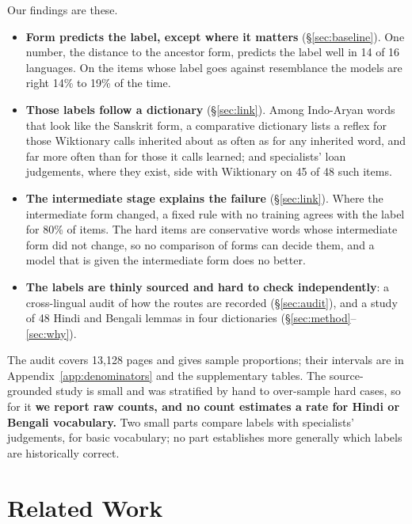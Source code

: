 \documentclass[11pt]{article}
\begin{document}
Our findings are these.
\begin{itemize}
\item \textbf{Form predicts the label, except where it matters} (\S\ref{sec:baseline}). One number, the distance to the ancestor form, predicts the label well in 14 of 16 languages. On the items whose label goes against resemblance the models are right 14\% to 19\% of the time.
\item \textbf{Those labels follow a dictionary} (\S\ref{sec:link}). Among Indo-Aryan words that look like the Sanskrit form, a comparative dictionary lists a reflex for those Wiktionary calls inherited about as often as for any inherited word, and far more often than for those it calls learned; and specialists' loan judgements, where they exist, side with Wiktionary on 45 of 48 such items.
\item \textbf{The intermediate stage explains the failure} (\S\ref{sec:link}). Where the intermediate form changed, a fixed rule with no training agrees with the label for 80\% of items. The hard items are conservative words whose intermediate form did not change, so no comparison of forms can decide them, and a model that is given the intermediate form does no better.
\item \textbf{The labels are thinly sourced and hard to check independently}: a cross-lingual audit of how the routes are recorded (\S\ref{sec:audit}), and a study of 48 Hindi and Bengali lemmas in four dictionaries (\S\ref{sec:method}--\ref{sec:why}).
\end{itemize}
The audit covers 13,128 pages and gives sample proportions; their intervals are in Appendix~\ref{app:denominators} and the supplementary tables. The source-grounded study is small and was stratified by hand to over-sample hard cases, so for it \textbf{we report raw counts, and no count estimates a rate for Hindi or Bengali vocabulary.} Two small parts compare labels with specialists' judgements, for basic vocabulary; no part establishes more generally which labels are historically correct.

\section{Related Work}
\end{document}
